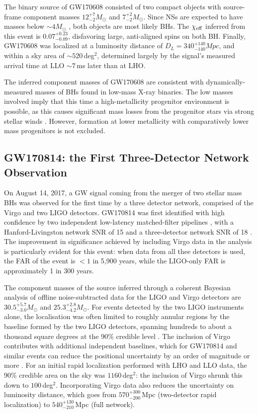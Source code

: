 \documentclass[binding=0.6cm, LaM]{sapthesis}
\begin{document}
	The binary source of GW170608 consisted of two compact objects with source-frame component masses 
	$12^{+7}_{-2}M_\odot$ and $7^{+2}_{-2}M_\odot$.  
	Since NSs are expected to have masses below $\sim 4M_\odot$ \cite{141},
	both objects are most likely BHs. 
	The $\chi_{\rm eff}$ inferred from this event is $0.07^{+0.23}_{−0.09}$,
	disfavoring large, anti-aligned spins on both BH.
        Finally, GW170608 was localized at a luminosity distance of $D_L = 340^{+140}_{−140}Mpc$, 
	and within a sky area of $\sim 520\,$deg$^2$, determined largely by the signal's measured arrival time at LLO $\sim 7$\,ms later than at LHO.
 
	The inferred component masses of GW170608 are consistent with 
	dynamically-measured masses of BHs found in low-mass X-ray binaries.
	The low masses involved imply that this time a high-metallicity progenitor environment is possible, 
	as this causes significant mass losses from the progenitor stars via strong stellar winds \cite{142}.
	However, formation at lower metallicity with comparatively lower mass progenitors is not excluded.

\subsection{GW170814: the First Three-Detector Network Observation}	

	On August 14, 2017, a GW signal coming from the merger of two stellar mass BHs 
	was observed for the first time by a three detector network, comprised of the Virgo and two LIGO detectors. 
	GW170814 was first identified with high confidence by two independent 
	low-latency matched-filter pipelines \cite{111,143,144,145,146,149},
	with a Hanford-Livingston network SNR of 15 and a three-detector network SNR of 18 \cite{114,150,151}.
	The improvement in significance achieved by including Virgo data in the analysis is particularly evident 
	for this event: when data from all thee detectors is used, 
	the FAR of the event is $< 1$ in 5,900 years, while the LIGO-only FAR is approximately 1 in 300 years.

	The component masses of the source inferred through a coherent Bayesian analysis \cite{93, 152} 
	of offline noise-subtracted data for the LIGO and Virgo detectors 
        are $30.5^{+5.7}_{-3.0}M_\odot$ and $25.3^{+2.8}_{-4.2}M_\odot$.
	For events detected by the two LIGO instruments alone, the localisation 
	was often limited to roughly annular regions by the baseline formed by the two LIGO detectors,
	spanning hundreds to about a thousand square degrees at the 90\% credible level \cite{165-167}. 
	The inclusion of Virgo contributes with additional independent baselines, 
	which for GW170814 and similar events can reduce the positional uncertainty by an order of magnitude or more \cite{166}. 
	For an initial rapid localization performed with LHO and LLO data, 
	the 90\% credible area on the sky was $1160\,$deg$^2$: the inclusion of Virgo shrunk this down to $100\,$deg$^2$.
	Incorporating Virgo data also reduces the uncertainty on luminosity distance, 
	which goes from $570^{+300}_{-200}\,$Mpc (two-detector rapid localization) to $540^{+130}_{-210}\,$Mpc (full network).
\end{document}
